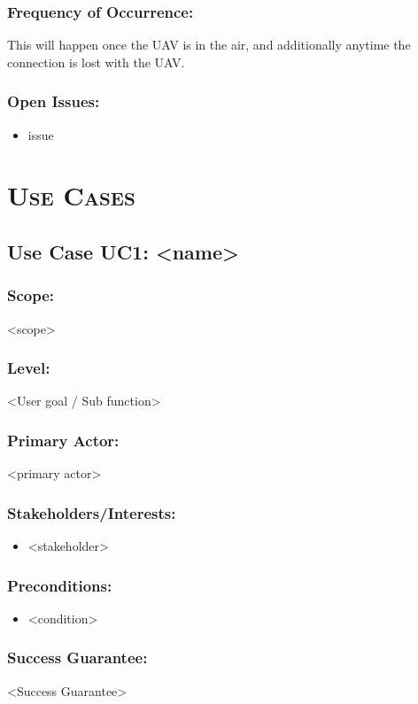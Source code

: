 \documentclass[ProductRequirements.tex]{subfiles}
\begin{document}
		\subsubsection{Frequency of Occurrence:}
			This will happen once the UAV is in the air, and additionally anytime the connection is lost with the UAV.
		\subsubsection{Open Issues:}
			\begin{itemize}\itemsep1pt
				\item issue
			\end{itemize}		
		
	
	\section{\textsc{\Large Use Cases}}
	\subsection{Use Case UC1: <name>}
	\subsubsection{Scope:}
	<scope>
	\subsubsection{Level:}
	<User goal / Sub function>
	\subsubsection{Primary Actor:}
	<primary actor>
	\subsubsection{Stakeholders/Interests:}
	\begin{itemize}\itemsep1pt
		\item <stakeholder>
	\end{itemize}
	\subsubsection{Preconditions:}
	\begin{itemize}\itemsep1pt
		\item <condition>
	\end{itemize}
	\subsubsection{Success Guarantee:}
	<Success Guarantee>
\end{document}

